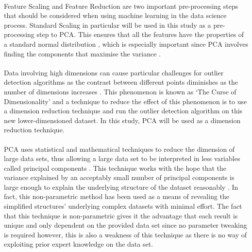 \paragraph{ }Feature Scaling and Feature Reduction are two important pre-processing steps that should be considered when using machine learning in the data science process. Standard Scaling in particular will be used in this study as a pre-processing step to \ac{PCA}. This ensures that all the features have the properties of a standard normal distribution \cite{Scikitlearn}, which is especially important since \acs{PCA} involves finding the components that maximise the variance \cite{Shlens2014}. 

\paragraph{ }Data involving high dimensions can cause particular challenges for outlier detection algorithms as the contrast between different points diminishes as the number of dimensions increases \cite{Zimek2012}. This phenomenon is known as `The Curse of Dimensionality' and a technique to reduce the effect of this phenomenon is to use a dimension reduction technique and run the outlier detection algorithm on this new lower-dimensioned dataset. In this study, \acs{PCA} will be used as a dimension reduction technique.

\paragraph{ }\acs{PCA} uses statistical and mathematical techniques to reduce the dimension of large data sets, thus allowing a large data set to be interpreted in less variables called principal components \cite{Richardson2009}. This technique works with the hope that the variance explained by an acceptably small number of principal components is large enough to explain the underlying structure of the dataset reasonably \cite{Shlens2014}. In fact, this non-parametric method has been used as a means of revealing the simplified structures' underlying complex datasets with minimal effort. The fact that this technique is non-parametric gives it the advantage that each result is unique and only dependent on the provided data set since no parameter tweaking is required \cite{Shlens2014} however, this is also a weakness of this technique as there is no way of exploiting prior expert knowledge on the data set.

